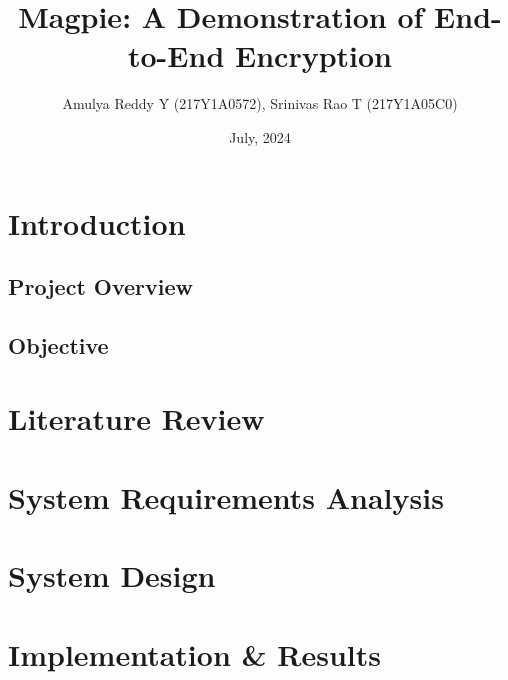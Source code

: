 \documentclass[12pt,a4paper]{article}
\title{Magpie: A Demonstration of End-to-End Encryption}
\author{Amulya Reddy Y (217Y1A0572), Srinivas Rao T (217Y1A05C0)}
\date{July, 2024}
\begin{document}
\maketitle
\tableofcontents
\newpage

\section{Introduction}

\subsection{Project Overview}

\subsection{Objective}


\section{Literature Review}


\section{System Requirements Analysis}


\section{System Design}



\section{Implementation \& Results}

\end{document}
